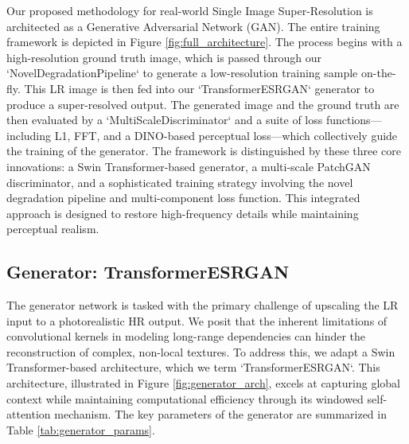 \documentclass{article}
\begin{document}
Our proposed methodology for real-world Single Image Super-Resolution is architected as a Generative Adversarial Network (GAN). The entire training framework is depicted in Figure \ref{fig:full_architecture}. The process begins with a high-resolution ground truth image, which is passed through our `NovelDegradationPipeline` to generate a low-resolution training sample on-the-fly. This LR image is then fed into our `TransformerESRGAN` generator to produce a super-resolved output. The generated image and the ground truth are then evaluated by a `MultiScaleDiscriminator` and a suite of loss functions—including L1, FFT, and a DINO-based perceptual loss—which collectively guide the training of the generator. The framework is distinguished by these three core innovations: a Swin Transformer-based generator, a multi-scale PatchGAN discriminator, and a sophisticated training strategy involving the novel degradation pipeline and multi-component loss function. This integrated approach is designed to restore high-frequency details while maintaining perceptual realism.

\begin{figure*}[t!]
\centering
\caption{The complete architecture of our proposed training framework, corresponding to `proposed merge.py`. (A) A ground truth HR image is selected. (B) It is degraded on-the-fly using a randomized pipeline to produce an LR input. (C) The `TransformerESRGAN` generator creates an SR image from the LR input. (D) A `MultiScaleDiscriminator` compares the SR and HR images to produce an adversarial loss. (E) A suite of loss functions (L1, FFT, and DINO Perceptual) further compare the SR and HR images. (F) The combined losses are used to update the generator, while the adversarial loss also updates the discriminator.}
\label{fig:full_architecture}
\end{figure*}

\subsection{Generator: TransformerESRGAN}

The generator network is tasked with the primary challenge of upscaling the LR input to a photorealistic HR output. We posit that the inherent limitations of convolutional kernels in modeling long-range dependencies can hinder the reconstruction of complex, non-local textures. To address this, we adapt a Swin Transformer-based architecture, which we term `TransformerESRGAN`. This architecture, illustrated in Figure \ref{fig:generator_arch}, excels at capturing global context while maintaining computational efficiency through its windowed self-attention mechanism. The key parameters of the generator are summarized in Table \ref{tab:generator_params}.
\end{document}
